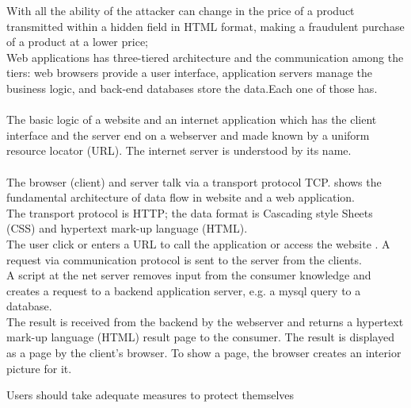 \documentclass[12pt]{article}
\begin{document}
With all the ability of the attacker can change in the price of a product transmitted within a hidden field in HTML format, making a fraudulent purchase of a product at a lower price;
\\

Web applications has 
three-tiered  architecture
and  the communication among the tiers: web browsers provide a  user interface, application servers manage the
business logic, and back-end databases store the  data.Each one of those has.\\
\\
The basic  logic of a website and an internet application which has the client interface and the server end on a webserver and made known by a uniform resource locator (URL). The internet server is understood by
its name. \\
\\

The browser (client) and server talk via a transport
protocol TCP.  shows the fundamental architecture of
data flow in website and a web application.
\\

 The transport
protocol is HTTP; the data format is Cascading style Sheets
(CSS) and hypertext mark-up language (HTML). \\

The user
click or enters a URL to call the application or access the website .
 A request via communication protocol is sent to
the server from the clients. 
\\

A script at the net server removes
input from the consumer knowledge and creates a request to a backend application server, e.g. a mysql query to a database.
\\

The result is received from the backend by the webserver and
returns a hypertext mark-up language (HTML) result page to the consumer. 
The result is displayed as a page by the client’s
browser. To show a page, the browser creates an interior
picture for it. 

\vspace{15PT}



Users should take adequate measures to protect themselves
\end{document}
